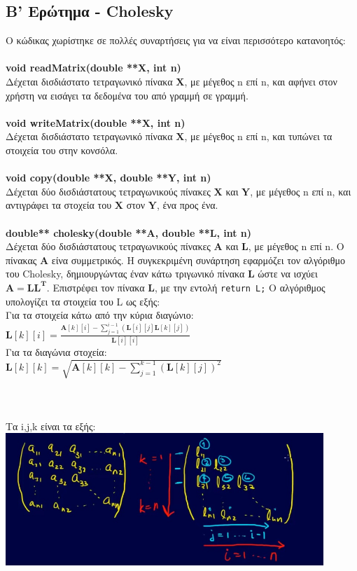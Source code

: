 \documentclass[a4paper, 14pt]{article}   %
\begin{document}
\subsection*{Β' Ερώτημα - Cholesky}  %
	Ο κώδικας χωρίστηκε σε πολλές συναρτήσεις για να είναι περισσότερο κατανοητός:\\\\
\textbf{void readMatrix(double **X, int n)}\\
	Δέχεται δισδιάστατο τετραγωνικό πίνακα $\mathbf{X}$, με μέγεθος n επί n, και αφήνει στον χρήστη να εισάγει τα δεδομένα του από γραμμή σε γραμμή.\\\\
\textbf{void writeMatrix(double **X, int n)}\\
	Δέχεται δισδιάστατο τετραγωνικό πίνακα $\mathbf{X}$, με μέγεθος n επί n, και τυπώνει τα στοιχεία του στην κονσόλα.\\\\
\textbf{void copy(double **X, double **Y, int n)}\\
	Δέχεται δύο δισδιάστατους τετραγωνικούς πίνακες $\mathbf{X}$ και $\mathbf{Y}$, με μέγεθος n επί n, και αντιγράφει τα στοχεία του $\mathbf{X}$ στον $\mathbf{Y}$, ένα προς ένα.\\\\
\textbf{double** cholesky(double **A, double **L, int n)}\\
	Δέχεται δύο δισδιάστατους τετραγωνικούς πίνακες $\mathbf{A}$ και $\mathbf{L}$, με μέγεθος n επί n. Ο πίνακας $\mathbf{A}$ είνα συμμετρικός. Η συγκεκριμένη συνάρτηση εφαρμόζει τον αλγόριθμο του Cholesky, δημιουργώντας έναν κάτω τριγωνικό πίνακα $\mathbf{L}$ ώστε να ισχύει $\mathbf{A} = \mathbf{L}\mathbf{L^T}$.  Επιστρέφει τον πίνακα $\mathbf{L}$, με την εντολή \texttt{return L;} Ο αλγόριθμος υπολογίζει τα στοιχεία του L ως εξής:\\
	Για τα στοιχεία κάτω από την κύρια διαγώνιο:\\
	$\mathbf{L}[k][i] = \frac{\mathbf{A}[k][i] - \sum_{j=1}^{i-1}(\mathbf{L}[i][j]\mathbf{L}[k][j])}{\mathbf{L}[i][i]}$\\
	Για τα διαγώνια στοχεία:\\
	$\mathbf{L}[k][k] = \sqrt{\mathbf{A}[k][k] - \sum_{j=1}^{k-1}(\mathbf{L}[k][j])^2}$\\\\\\\\
Τα i,j,k είναι τα εξής:\\
  \includegraphics[height=5cm]{cholesky.jpg}\\\\\\
\end{document}

